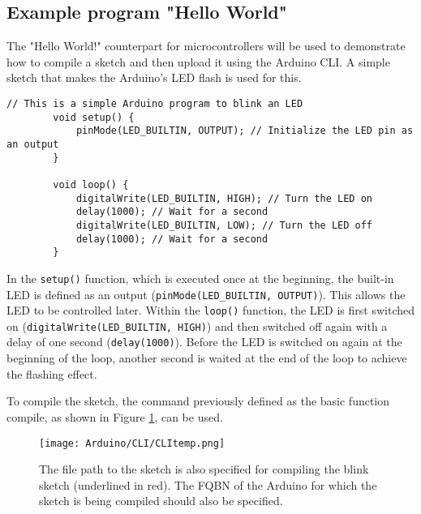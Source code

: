 \subsection{Example program "Hello World"}

The "Hello World!" counterpart for microcontrollers will be used to demonstrate how to compile a sketch and then upload it using the Arduino CLI. A simple sketch that makes the Arduino's LED flash is used for this.

\begin{code}
    \centering
    \begin{lstlisting}[caption=Arduino Blink Example, label=lst:arduino_blink]
        // This is a simple Arduino program to blink an LED
        void setup() {
            pinMode(LED_BUILTIN, OUTPUT); // Initialize the LED pin as an output
        }
        
        void loop() {
            digitalWrite(LED_BUILTIN, HIGH); // Turn the LED on
            delay(1000); // Wait for a second
            digitalWrite(LED_BUILTIN, LOW); // Turn the LED off
            delay(1000); // Wait for a second
        }
    \end{lstlisting}
\end{code}

In the \texttt{setup()} function, which is executed once at the beginning, the built-in LED is defined as an output (\texttt{pinMode(LED\_BUILTIN, OUTPUT)}). This allows the LED to be controlled later. Within the \texttt{loop()} function, the LED is first switched on (\texttt{digitalWrite(LED\_BUILTIN, HIGH)}) and then switched off again with a delay of one second (\texttt{delay(1000)}). Before the LED is switched on again at the beginning of the loop, another second is waited at the end of the loop to achieve the flashing effect.

To compile the sketch, the command previously defined as the basic function compile, as shown in Figure \ref{CompileSketch}, can be used.
\begin{figure}
    \begin{center}
        \texttt{[image: Arduino/CLI/CLItemp.png]}
        \caption{The file path to the sketch is also specified for compiling the blink sketch (underlined in red). The FQBN of the Arduino for which the sketch is being compiled should also be specified.}
        \label{CompileSketch}
    \end{center}
\end{figure}

